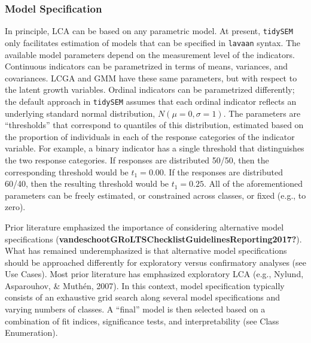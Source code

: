 \documentclass[
  ,man,floatsintext]{apa6}
\begin{document}
\hypertarget{model-specification}{%
\subsubsection{Model Specification}\label{model-specification}}

In principle, LCA can be based on any parametric model. At present,
\texttt{tidySEM} only facilitates estimation of models that can be specified in
\texttt{lavaan} syntax. The available model parameters depend on the
measurement level of the indicators. Continuous indicators can be
parametrized in terms of means, variances, and covariances. LCGA and GMM
have these same parameters, but with respect to the latent growth
variables. Ordinal indicators can be parametrized differently; the
default approach in \texttt{tidySEM} assumes that each ordinal indicator
reflects an underlying standard normal distribution,
\(N(\mu = 0, \sigma = 1)\). The parameters are ``thresholds'' that
correspond to quantiles of this distribution, estimated based on the
proportion of individuals in each of the response categories of the
indicator variable. For example, a binary indicator has a single
threshold that distinguishes the two response categories. If responses
are distributed 50/50, then the corresponding threshold would be
\(t_1 = 0.00\). If the responses are distributed 60/40, then the resulting
threshold would be \(t_1 = 0.25\). All of the aforementioned parameters
can be freely estimated, or constrained across classes, or fixed (e.g.,
to zero).

Prior literature emphasized the importance of considering alternative
model specifications
(\textbf{vandeschootGRoLTSChecklistGuidelinesReporting2017?}). What has remained
underemphasized is that alternative model specifications should be
approached differently for exploratory versus confirmatory analyses (see
Use Cases). Most prior literature has emphasized exploratory LCA (e.g., Nylund, Asparouhov, \& Muthén, 2007). In this context, model specification typically
consists of an exhaustive grid search along several model specifications
and varying numbers of classes. A ``final'' model is then selected based
on a combination of fit indices, significance tests, and
interpretability (see Class Enumeration).
\end{document}

